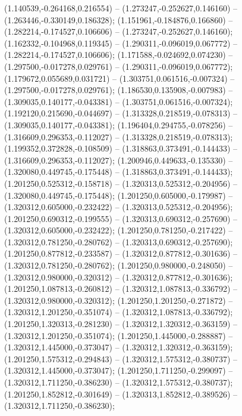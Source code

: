  (1.140539,-0.264168,0.216554) -- (1.273247,-0.252627,0.146160) -- (1.263446,-0.330149,0.186328);
 (1.151961,-0.184876,0.166860) -- (1.282214,-0.174527,0.106606) -- (1.273247,-0.252627,0.146160);
 (1.162332,-0.104968,0.119345) -- (1.290311,-0.096019,0.067772) -- (1.282214,-0.174527,0.106606);
 (1.171588,-0.024692,0.074230) -- (1.297500,-0.017278,0.029761) -- (1.290311,-0.096019,0.067772);
 (1.179672,0.055689,0.031721) -- (1.303751,0.061516,-0.007324) -- (1.297500,-0.017278,0.029761);
 (1.186530,0.135908,-0.007983) -- (1.309035,0.140177,-0.043381) -- (1.303751,0.061516,-0.007324);
 (1.192120,0.215690,-0.044697) -- (1.313328,0.218519,-0.078313) -- (1.309035,0.140177,-0.043381);
 (1.196404,0.294755,-0.078256) -- (1.316609,0.296353,-0.112027) -- (1.313328,0.218519,-0.078313);
 (1.199352,0.372828,-0.108509) -- (1.318863,0.373491,-0.144433) -- (1.316609,0.296353,-0.112027);
 (1.200946,0.449633,-0.135330) -- (1.320080,0.449745,-0.175448) -- (1.318863,0.373491,-0.144433);
 (1.201250,0.525312,-0.158718) -- (1.320313,0.525312,-0.204956) -- (1.320080,0.449745,-0.175448);
 (1.201250,0.605000,-0.179987) -- (1.320312,0.605000,-0.232422) -- (1.320313,0.525312,-0.204956);
 (1.201250,0.690312,-0.199555) -- (1.320313,0.690312,-0.257690) -- (1.320312,0.605000,-0.232422);
 (1.201250,0.781250,-0.217422) -- (1.320312,0.781250,-0.280762) -- (1.320313,0.690312,-0.257690);
 (1.201250,0.877812,-0.233587) -- (1.320312,0.877812,-0.301636) -- (1.320312,0.781250,-0.280762);
 (1.201250,0.980000,-0.248050) -- (1.320312,0.980000,-0.320312) -- (1.320312,0.877812,-0.301636);
 (1.201250,1.087813,-0.260812) -- (1.320312,1.087813,-0.336792) -- (1.320312,0.980000,-0.320312);
 (1.201250,1.201250,-0.271872) -- (1.320312,1.201250,-0.351074) -- (1.320312,1.087813,-0.336792);
 (1.201250,1.320313,-0.281230) -- (1.320312,1.320312,-0.363159) -- (1.320312,1.201250,-0.351074);
 (1.201250,1.445000,-0.288887) -- (1.320312,1.445000,-0.373047) -- (1.320312,1.320312,-0.363159);
 (1.201250,1.575312,-0.294843) -- (1.320312,1.575312,-0.380737) -- (1.320312,1.445000,-0.373047);
 (1.201250,1.711250,-0.299097) -- (1.320312,1.711250,-0.386230) -- (1.320312,1.575312,-0.380737);
 (1.201250,1.852812,-0.301649) -- (1.320313,1.852812,-0.389526) -- (1.320312,1.711250,-0.386230);
